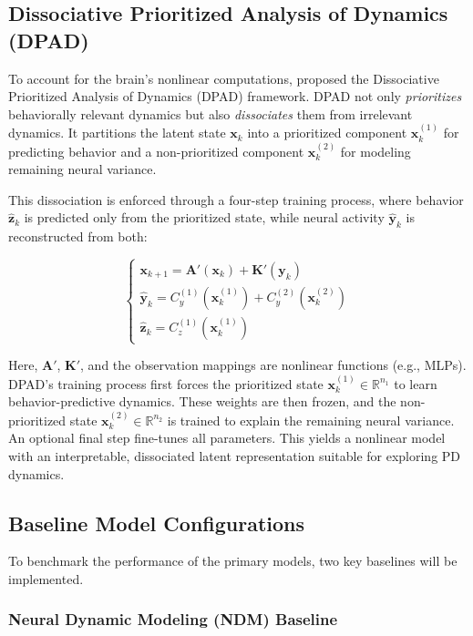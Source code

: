 \documentclass[12pt, letterpaper]{article}
\begin{document}
\subsection{Dissociative Prioritized Analysis of Dynamics (DPAD)}

To account for the brain's nonlinear computations, \textcite{saniDissociativePrioritizedModeling2024} proposed the Dissociative Prioritized Analysis of Dynamics (DPAD) framework. DPAD not only \textit{prioritizes} behaviorally relevant dynamics but also \textit{dissociates} them from irrelevant dynamics. It partitions the latent state $\mathbf{x}_k$ into a prioritized component $\mathbf{x}_k^{(1)}$ for predicting behavior and a non-prioritized component $\mathbf{x}_k^{(2)}$ for modeling remaining neural variance.

This dissociation is enforced through a four-step training process, where behavior $\hat{\mathbf{z}}_k$ is predicted only from the prioritized state, while neural activity $\hat{\mathbf{y}}_k$ is reconstructed from both:

$$
    \begin{cases}
        \mathbf{x}_{k+1} = \mathbf{A}'(\mathbf{x}_k) + \mathbf{K}'(\mathbf{y}_k)           \\
        \hat{\mathbf{y}}_k = C_y^{(1)}(\mathbf{x}_k^{(1)}) + C_y^{(2)}(\mathbf{x}_k^{(2)}) \\
        \hat{\mathbf{z}}_k = C_z^{(1)}(\mathbf{x}_k^{(1)})
    \end{cases}
$$

Here, $\mathbf{A}'$, $\mathbf{K}'$, and the observation mappings are nonlinear functions (e.g., MLPs). DPAD's training process first forces the prioritized state $\mathbf{x}_k^{(1)} \in \mathbb{R}^{n_1}$ to learn behavior-predictive dynamics. These weights are then frozen, and the non-prioritized state $\mathbf{x}_k^{(2)} \in \mathbb{R}^{n_2}$ is trained to explain the remaining neural variance. An optional final step fine-tunes all parameters. This yields a nonlinear model with an interpretable, dissociated latent representation suitable for exploring PD dynamics.


\subsection{Baseline Model Configurations}
To benchmark the performance of the primary models, two key baselines will be implemented.

\subsubsection{Neural Dynamic Modeling (NDM) Baseline}
\end{document}
